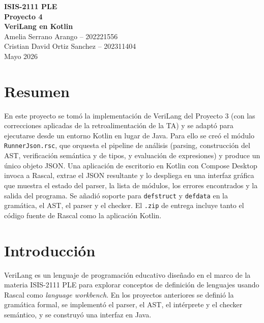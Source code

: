 \documentclass[12pt]{article}
\newcommand{\code}[1]{\texttt{#1}}
\begin{document}
\begin{center}
  {\Large\textbf{ISIS-2111 PLE}}\\[0.4cm]
  {\Large\textbf{Proyecto 4}}\\[0.6cm]
  {\LARGE\textbf{VeriLang en Kotlin}}\\[0.8cm]

  Amelia Serrano Arango -- 202221556\\
  Cristian David Ortiz Sanchez -- 202311404\\[0.4cm]
  Mayo 2026
\end{center}

\vspace{0.6cm}

\section*{Resumen}

En este proyecto se tomó la implementación de VeriLang del Proyecto 3 (con las correcciones
aplicadas de la retroalimentación de la TA) y se adaptó para ejecutarse desde un entorno
Kotlin en lugar de Java. Para ello se creó el módulo \code{RunnerJson.rsc}, que orquesta
el pipeline de análisis (parsing, construcción del AST, verificación semántica y de tipos,
y evaluación de expresiones) y produce un único objeto JSON. Una aplicación de escritorio
en Kotlin con Compose Desktop invoca a Rascal, extrae el JSON resultante y lo despliega
en una interfaz gráfica que muestra el estado del parser, la lista de módulos, los errores
encontrados y la salida del programa. Se añadió soporte para \code{defstruct} y
\code{defdata} en la gramática, el AST, el parser y el checker. El \code{.zip} de entrega
incluye tanto el código fuente de Rascal como la aplicación Kotlin.

\newpage

\tableofcontents
\newpage

\section{Introducción}

VeriLang es un lenguaje de programación educativo diseñado en el marco de la materia
ISIS-2111 PLE para explorar conceptos de definición de lenguajes usando Rascal como
\emph{language workbench}. En los proyectos anteriores se definió la gramática formal, se
implementó el parser, el AST, el intérprete y el checker semántico, y se construyó una
interfaz en Java.
\end{document}
